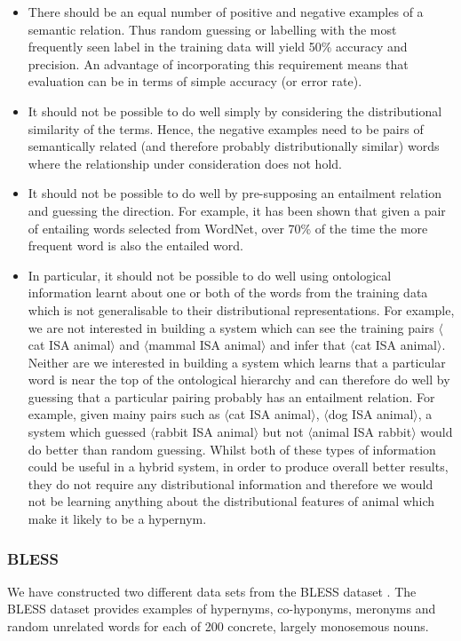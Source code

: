 \documentclass[11pt]{article}
\newcommand\pair[2]{$\langle$#1 ISA #2$\rangle$}
\begin{document}
\begin{itemize}
\item There should be an equal number of positive and negative examples of a semantic relation.  Thus random guessing or labelling with the most frequently seen label in the training data will yield 50\% accuracy and precision.  An advantage of incorporating this requirement means that evaluation can be in terms of simple accuracy (or error rate).
\item It should not be possible to do well simply by considering the distributional similarity of the terms.  Hence, the negative examples need to be pairs of semantically related (and therefore probably distributionally similar) words where the relationship under consideration does not hold.
\item It should not be possible to do well by pre-supposing an entailment relation and guessing the direction.  For example, it has been shown that given a pair of entailing words selected from WordNet, over 70\% of the time the more frequent word is also the entailed word.
\item In particular, it should not be possible to do well using ontological information learnt about one or both of the words from the training data which is not generalisable to their distributional representations.  For example, we are not interested in building a system which can see the training pairs \pair{cat}{animal} and \pair{mammal}{animal} and infer that \pair{cat}{animal}.  Neither are we interested in building a system which learns that a particular word is near the top of the ontological hierarchy and can therefore do well by guessing that a particular pairing probably has an entailment relation.  For example, given mainy pairs such as \pair{cat}{animal}, \pair{dog}{animal}, a system which guessed \pair{rabbit}{animal} but not \pair{animal}{rabbit} would do better than random guessing.  Whilst both of these types of information could be useful in a hybrid system, in order to produce overall better results, they do not require any distributional information and therefore we would not be learning anything about the distributional features of animal which make it likely to be a hypernym.
\end{itemize}


\subsubsection{BLESS}
We have constructed two different data sets from the BLESS dataset \cite{Baroni2011}.  The BLESS dataset provides examples of hypernyms, co-hyponyms, meronyms and random unrelated words for each of 200 concrete, largely monosemous nouns.
\end{document}
